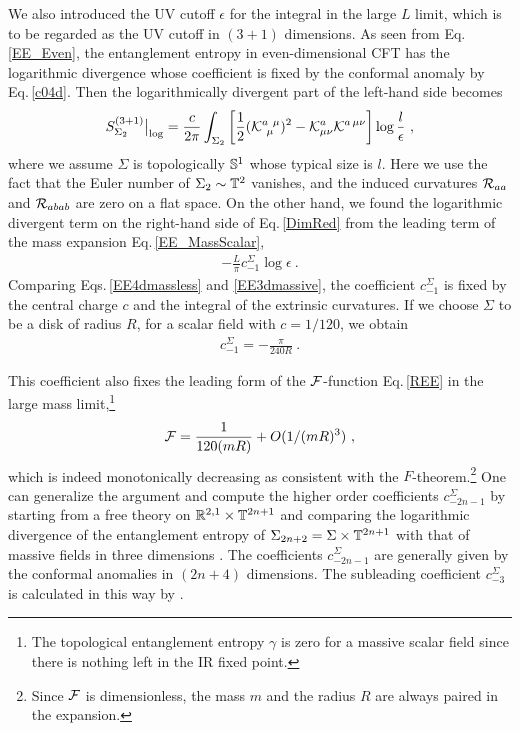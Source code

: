 We also introduced the UV cutoff $\epsilon$ for the integral in the large $L$ limit, which is to be regarded as the UV cutoff in $(3+1)$ dimensions.
As seen from Eq.\,\eqref{EE_Even}, the entanglement entropy in even-dimensional CFT has the logarithmic divergence whose coefficient is fixed by the conformal anomaly by Eq.\,\eqref{c04d}.
Then the logarithmically divergent part of the left-hand side becomes
\begin{align}\label{EE4dmassless}
S_{\Sigma_2}^{(3+1)}\big|_\text{log} = \frac{c}{2\pi} \int_{\Sigma_2}\left[\frac{1}{2}({\cal K}^{a~\mu}_{~\mu})^2 -  {\cal K}^a_{\mu\nu}{\cal K}^{a\,\mu\nu} \right] \log \frac{l}{\epsilon}\ ,
\end{align}
where we assume $\Sigma$ is topologically $\mathbb{S}^1$ whose typical size is $l$.
Here we use the fact that the Euler number of $\Sigma_2 \sim {\mathbb T}^2$ vanishes, and the induced curvatures ${\cal R}_{aa}$ and ${\cal R}_{abab}$ are zero on a flat space.
On the other hand, we found the logarithmic divergent term on the right-hand side of Eq.\,\eqref{DimRed} from the leading term of the mass expansion Eq.\,\eqref{EE_MassScalar},
\begin{align}\label{EE3dmassive}
- \frac{L}{\pi} c_{-1}^\Sigma \log\epsilon \ .
\end{align}
Comparing Eqs.\,\eqref{EE4dmassless} and \eqref{EE3dmassive}, the coefficient $c_{-1}^\Sigma$ is fixed by the central charge $c$ and the integral of the extrinsic curvatures.
If we choose $\Sigma$ to be a disk of radius $R$, for a scalar field with $c=1/120$, we obtain \cite{Huerta:2011qi,Klebanov:2012yf}
\begin{align}
c_{-1}^\Sigma = - \frac{\pi}{240R} \ .
\end{align}

This coefficient also fixes the leading form of the ${\cal F}$-function Eq.\,\eqref{REE} in the large mass limit,\footnote{The topological entanglement entropy $\gamma$ is zero for a massive scalar field since there is nothing left in the IR fixed point.}
\begin{align}\label{LargeMassExpansionScalar}
{\cal F} = \frac{1}{120(mR)} + O(1/(mR)^3) \ ,
\end{align}
which is indeed monotonically decreasing as consistent with the $F$-theorem.\footnote{Since ${\cal F}$ is dimensionless, the mass $m$ and the radius $R$ are always paired in the expansion.}
One can generalize the argument and compute the higher order coefficients $c_{-2n-1}^\Sigma$ by starting from a free theory on $\mathbb{R}^{2,1}\times {\mathbb T}^{2n+1}$ and comparing the logarithmic divergence of the entanglement entropy of $\Sigma_{2n+2} = \Sigma\times {\mathbb T}^{2n+1}$ with that of massive fields in three dimensions \cite{Klebanov:2012yf}.
The coefficients $c_{-2n-1}^\Sigma$ are generally given by the conformal anomalies in $(2n+4)$ dimensions.
The subleading coefficient $c_{-3}^\Sigma$ is calculated in this way by \textcite{Klebanov:2012yf,Safdi:2012sn}.

